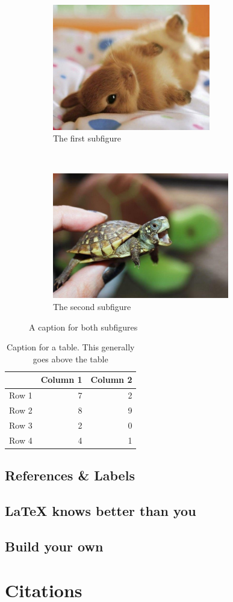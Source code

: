 \documentclass{article}
\begin{document}
\begin{figure}[h!]
    \centering
    \begin{subfigure}{0.47\textwidth}
        \includegraphics[height=5.5cm]{rabbit.jpg}
        \caption{The first subfigure}
    \end{subfigure}
    ~
    \begin{subfigure}{0.47\textwidth}
        \includegraphics[height=5.5cm]{turtle.jpg}
        \caption{The second subfigure}
    \end{subfigure}
    \caption{A caption for both subfigures}
\end{figure}

\begin{table}
    \centering
    \caption{Caption for a table. This generally goes above the table}
    \begin{tabular}{lrr}
      \toprule
      & Column 1 & Column 2 \\
      \midrule
      Row 1 & 7 & 2 \\
      Row 2 & 8 & 9 \\
      Row 3 & 2 & 0 \\
      Row 4 & 4 & 1 \\
      \bottomrule
    \end{tabular}
\end{table}

\subsection{References \& Labels}


\subsection{\LaTeX{} knows better than you}


\subsection{Build your own}


\section{Citations}


\printbibliography
\end{document}
